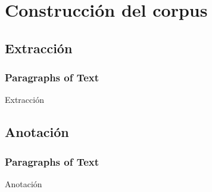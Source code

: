 \section{Construcción del corpus} %

\subsection{Extracción}
\begin{frame}
\frametitle{Paragraphs of Text}
Extracción
\end{frame}

\subsection{Anotación}
\begin{frame}
\frametitle{Paragraphs of Text}
Anotación
\end{frame}
